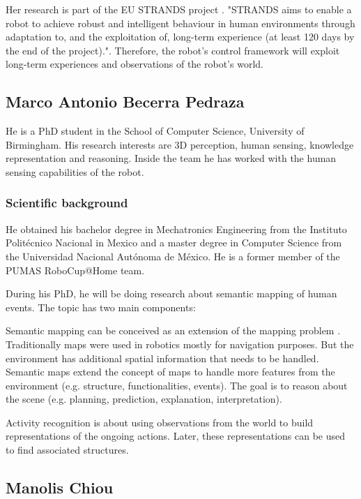 \documentclass[conference]{IEEEtran}
\begin{document}
Her research is part of the EU STRANDS project \cite{strands}. "STRANDS aims to enable a robot to achieve robust and intelligent behaviour in human environments through adaptation to, and the exploitation of, long-term experience (at least 120 days by the end of the project).". Therefore, the robot's control framework will exploit long-term experiences and observations of the robot's world. 

\subsection{Marco Antonio Becerra Pedraza}

He is a PhD student in the School of Computer Science, University of Birmingham. His research interests are 3D perception, human sensing, knowledge representation and reasoning. Inside the team he has worked with the human sensing capabilities of the robot.

\subsubsection*{Scientific background}
He obtained his bachelor degree in Mechatronics Engineering from the Instituto Polit\'{e}cnico Nacional in Mexico and a master degree in Computer Science from the Universidad Nacional Aut\'{o}noma de M\'{e}xico. He is a former member of the PUMAS RoboCup@Home team.

During his PhD, he will be doing research about semantic mapping of human events. The topic has two main components:

Semantic mapping can be conceived as an extension of the mapping problem \cite{Nuchter08_TowardsSemanticMaps}. Traditionally maps were used in robotics mostly for navigation purposes. But the environment has additional spatial information that needs to be handled. Semantic maps extend the concept of maps to handle more features from the environment (e.g. structure, functionalities, events). The goal is to reason about the scene (e.g. planning, prediction, explanation, interpretation).

Activity recognition is about using observations from the world to build representations of the ongoing actions. Later, these representations can be used to find associated structures.

\subsection{Manolis Chiou}
\end{document}
